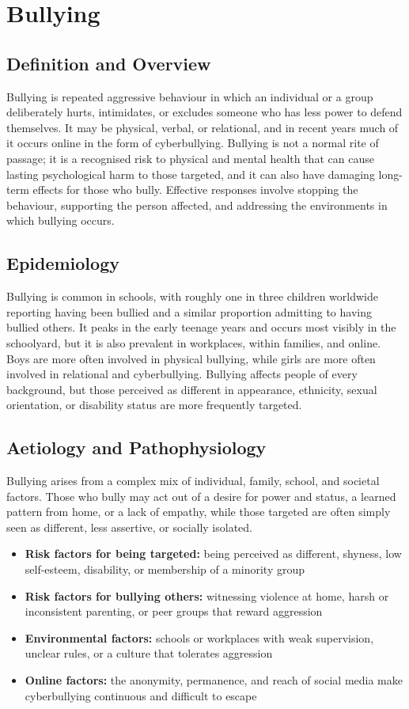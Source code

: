 \chapter{Bullying}

\section*{Definition and Overview}
Bullying is repeated aggressive behaviour in which an individual or a group deliberately hurts, intimidates, or excludes someone who has less power to defend themselves. It may be physical, verbal, or relational, and in recent years much of it occurs online in the form of cyberbullying. Bullying is not a normal rite of passage; it is a recognised risk to physical and mental health that can cause lasting psychological harm to those targeted, and it can also have damaging long-term effects for those who bully. Effective responses involve stopping the behaviour, supporting the person affected, and addressing the environments in which bullying occurs.

\section*{Epidemiology}
Bullying is common in schools, with roughly one in three children worldwide reporting having been bullied and a similar proportion admitting to having bullied others. It peaks in the early teenage years and occurs most visibly in the schoolyard, but it is also prevalent in workplaces, within families, and online. Boys are more often involved in physical bullying, while girls are more often involved in relational and cyberbullying. Bullying affects people of every background, but those perceived as different in appearance, ethnicity, sexual orientation, or disability status are more frequently targeted.

\section*{Aetiology and Pathophysiology}
Bullying arises from a complex mix of individual, family, school, and societal factors. Those who bully may act out of a desire for power and status, a learned pattern from home, or a lack of empathy, while those targeted are often simply seen as different, less assertive, or socially isolated.

\begin{itemize}
    \item \textbf{Risk factors for being targeted:} being perceived as different, shyness, low self-esteem, disability, or membership of a minority group
    \item \textbf{Risk factors for bullying others:} witnessing violence at home, harsh or inconsistent parenting, or peer groups that reward aggression
    \item \textbf{Environmental factors:} schools or workplaces with weak supervision, unclear rules, or a culture that tolerates aggression
    \item \textbf{Online factors:} the anonymity, permanence, and reach of social media make cyberbullying continuous and difficult to escape
\end{itemize}

